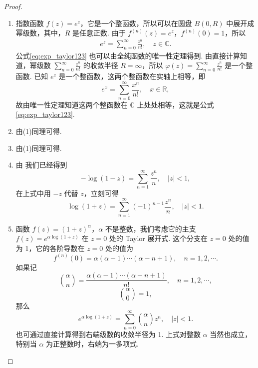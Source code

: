 \documentclass[../../main.tex]{subfiles}
\begin{document}
\begin{proof}
\begin{enumerate}[(1)]
\item 指数函数 \( f(z) = e^z \)，它是一个整函数，所以可以在圆盘 \( B(0,R) \) 中展开成幂级数，其中，\( R \) 是任意正数. 由于 \( f^{(n)}(z) = e^z \)，\( f^{(n)}(0) = 1 \)，所以
\begin{align}
e^z = \sum_{n=0}^{\infty} \frac{z^n}{n!}, \quad z \in \mathbb{C}. \label{eq:exp_taylor123}
\end{align}
公式\eqref{eq:exp_taylor123} 也可以由全纯函数的唯一性定理得到. 由直接计算知道，幂级数 \( \sum_{n=0}^{\infty} \frac{z^n}{n!} \) 的收敛半径 \( R = \infty \)，所以 \( \varphi(z) = \sum_{n=0}^{\infty} \frac{z^n}{n!} \) 是一个整函数. 已知 \( e^z \) 是一个整函数，这两个整函数在实轴上相等，即
\[
e^x = \sum_{n=0}^{\infty} \frac{x^n}{n!}, \quad x \in \mathbb{R},
\]
故由唯一性定理知道这两个整函数在 \( \mathbb{C} \) 上处处相等，这就是公式 \eqref{eq:exp_taylor123}.

\item 由(1)同理可得.

\item 由(1)同理可得.

\item 由 我们已经得到
\[
- \log(1 - z) = \sum_{n=1}^{\infty} \frac{z^n}{n}, \quad |z| < 1,
\]
在上式中用 \( -z \) 代替 \( z \)，立刻可得
\[
\log(1 + z) = \sum_{n=1}^{\infty} (-1)^{n - 1} \frac{z^n}{n}, \quad |z| < 1.
\]

\item 函数 \( f(z) = (1 + z)^{\alpha} \)，\( \alpha \) 不是整数，我们考虑它的主支 \( f(z) = e^{\alpha \log(1 + z)} \) 在 \( z = 0 \) 处的 Taylor 展开式. 这个分支在 \( z = 0 \) 处的值为 1，它的各阶导数在 \( z = 0 \) 处的值为
\[
f^{(n)}(0) = \alpha(\alpha - 1) \cdots (\alpha - n + 1), \quad n = 1, 2, \cdots.
\]
如果记
\[
\binom{\alpha}{n} = \frac{\alpha(\alpha - 1) \cdots (\alpha - n + 1)}{n!}, \quad n = 1, 2, \cdots,
\]
\[
\binom{\alpha}{0} = 1,
\]
那么
\[
e^{\alpha \log(1 + z)} = \sum_{n=0}^{\infty} \binom{\alpha}{n} z^n, \quad |z| < 1.
\]
也可通过直接计算得到右端级数的收敛半径为 1. 上式对整数 \( \alpha \) 当然也成立，特别当 \( \alpha \) 为正整数时，右端为一多项式.
\end{enumerate}
\end{proof}
\end{document}

